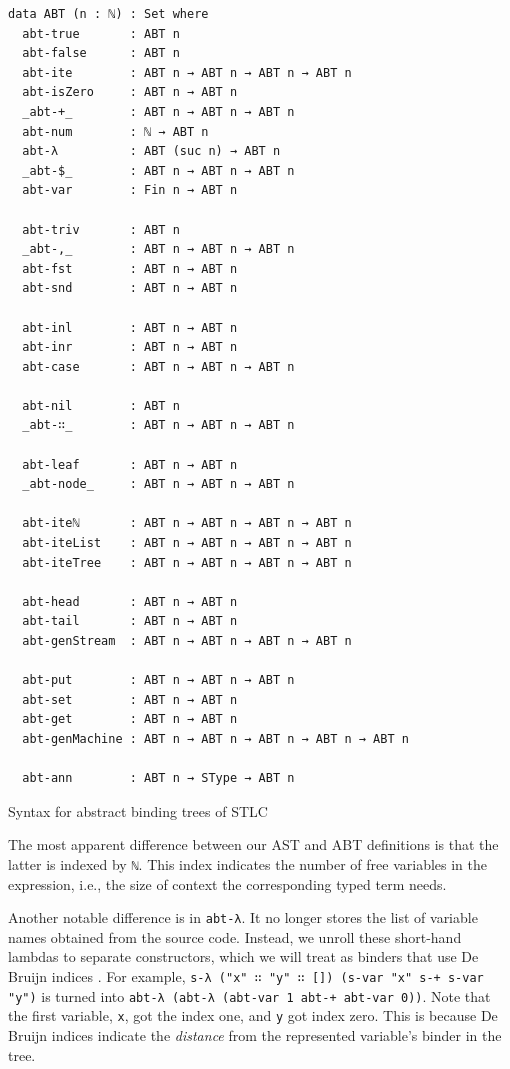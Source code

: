 \begin{listing}[H]
\begin{verbatim}
data ABT (n : ℕ) : Set where
  abt-true       : ABT n
  abt-false      : ABT n
  abt-ite        : ABT n → ABT n → ABT n → ABT n
  abt-isZero     : ABT n → ABT n
  _abt-+_        : ABT n → ABT n → ABT n
  abt-num        : ℕ → ABT n
  abt-λ          : ABT (suc n) → ABT n
  _abt-$_        : ABT n → ABT n → ABT n
  abt-var        : Fin n → ABT n

  abt-triv       : ABT n
  _abt-,_        : ABT n → ABT n → ABT n
  abt-fst        : ABT n → ABT n
  abt-snd        : ABT n → ABT n

  abt-inl        : ABT n → ABT n
  abt-inr        : ABT n → ABT n
  abt-case       : ABT n → ABT n → ABT n

  abt-nil        : ABT n
  _abt-∷_        : ABT n → ABT n → ABT n

  abt-leaf       : ABT n → ABT n
  _abt-node_     : ABT n → ABT n → ABT n

  abt-iteℕ       : ABT n → ABT n → ABT n → ABT n
  abt-iteList    : ABT n → ABT n → ABT n → ABT n
  abt-iteTree    : ABT n → ABT n → ABT n → ABT n

  abt-head       : ABT n → ABT n
  abt-tail       : ABT n → ABT n
  abt-genStream  : ABT n → ABT n → ABT n → ABT n

  abt-put        : ABT n → ABT n → ABT n
  abt-set        : ABT n → ABT n
  abt-get        : ABT n → ABT n
  abt-genMachine : ABT n → ABT n → ABT n → ABT n → ABT n

  abt-ann        : ABT n → SType → ABT n
\end{verbatim}
\caption{Syntax for abstract binding trees of STLC}
\label{code:abt-def}
\end{listing}

The most apparent difference between our AST and ABT definitions is that the latter is indexed by \verb$ℕ$. This index indicates the number of free variables in the expression, i.e., the size of context the corresponding typed term needs.

Another notable difference is in \verb$abt-λ$. It no longer stores the list of variable names obtained from the source code. Instead, we unroll these short-hand lambdas to separate constructors, which we will treat as binders that use De Bruijn indices \cite{de1972lambda}. For example, \verb$s-λ ("x" ∷ "y" ∷ []) (s-var "x" s-+ s-var "y")$ is turned into \verb$abt-λ (abt-λ (abt-var 1 abt-+ abt-var 0))$. Note that the first variable, \verb$x$, got the index one, and \verb$y$ got index zero. This is because De Bruijn indices indicate the \textit{distance} from the represented variable's binder in the tree.

